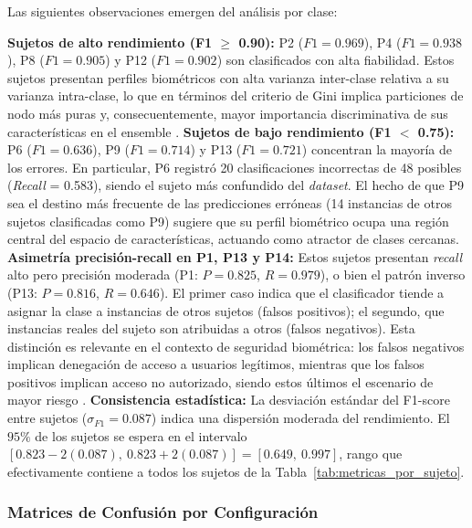 Las siguientes observaciones emergen del análisis por clase:

\textbf{Sujetos de alto rendimiento (F1 $\geq$ 0.90):} P2 ($F1 = 0.969$), P4 ($F1 = 0.938$), P8 ($F1 = 0.905$) y P12 ($F1 = 0.902$) son clasificados con alta fiabilidad.
Estos sujetos presentan perfiles biométricos con alta varianza inter-clase relativa a su varianza intra-clase, lo que en términos del criterio de Gini implica particiones de nodo más puras y, consecuentemente, mayor importancia discriminativa de sus características en el ensemble \cite{breiman2001}.
\textbf{Sujetos de bajo rendimiento (F1 $<$ 0.75):} P6 ($F1 = 0.636$), P9 ($F1 = 0.714$) y P13 ($F1 = 0.721$) concentran la mayoría de los errores.
En particular, P6 registró 20 clasificaciones incorrectas de 48 posibles (\textit{Recall} = 0.583), siendo el sujeto más confundido del \textit{dataset}.
El hecho de que P9 sea el destino más frecuente de las predicciones erróneas (14 instancias de otros sujetos clasificadas como P9) sugiere que su perfil biométrico ocupa una región central del espacio de características, actuando como atractor de clases cercanas.
\textbf{Asimetría precisión-recall en P1, P13 y P14:} Estos sujetos presentan \textit{recall} alto pero precisión moderada (P1: $P=0.825$, $R=0.979$), o bien el patrón inverso (P13: $P=0.816$, $R=0.646$).
El primer caso indica que el clasificador tiende a asignar la clase a instancias de otros sujetos (falsos positivos);
el segundo, que instancias reales del sujeto son atribuidas a otros (falsos negativos).
Esta distinción es relevante en el contexto de seguridad biométrica: los falsos negativos implican denegación de acceso a usuarios legítimos, mientras que los falsos positivos implican acceso no autorizado, siendo estos últimos el escenario de mayor riesgo \cite{duchowski2017}.
\textbf{Consistencia estadística:} La desviación estándar del F1-score entre sujetos ($\sigma_{F1} = 0.087$) indica una dispersión moderada del rendimiento.
El $95\%$ de los sujetos se espera en el intervalo $[0.823 - 2(0.087),\ 0.823 + 2(0.087)] = [0.649,\ 0.997]$, rango que efectivamente contiene a todos los sujetos de la Tabla~\ref{tab:metricas_por_sujeto}.
\subsubsection{Matrices de Confusión por Configuración}

